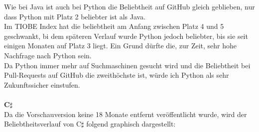 \documentclass[ngerman]{article}
\begin{document}
    Wie bei Java ist auch bei Python die Beliebtheit auf GitHub gleich geblieben, nur dass Python mit Platz 2 beliebter ist als Java.\\
    Im TIOBE Index hat die beliebtheit am Anfang zwischen Platz 4 und 5 geschwankt, bi dem späteren Verlauf wurde Python jedoch beliebter, bis sie seit einigen Monaten auf Platz 3 liegt. Ein Grund dürfte die, zur Zeit, sehr hohe Nachfrage nach Python sein.\\
    Da Python immer mehr auf Suchmaschinen gesucht wird und die Beliebtheit bei Pull-Requests auf GitHub die zweithöchste ist, würde ich Python als sehr Zukunftssicher einstufen.\\\\
    \textbf{C$\sharp$}\\
    Da die Vorschauversion keine 18 Monate entfernt veröffentlicht wurde, wird der Beliebtheitsverlauf von C$\sharp$ folgend graphisch dargestellt:
\end{document}
